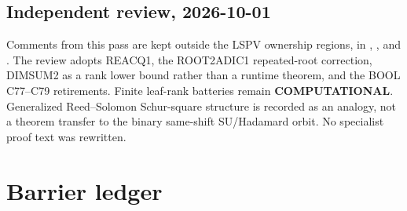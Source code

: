 \documentclass[11pt]{article}
\begin{document}
\subsection{Independent review, 2026-10-01}

Comments from this pass are kept outside the LSPV ownership regions, in
, , and .
The review adopts REACQ1, the ROOT2ADIC1 repeated-root correction, DIMSUM2 as a
rank lower bound rather than a runtime theorem, and the BOOL C77--C79 retirements.
Finite leaf-rank batteries remain \textbf{COMPUTATIONAL}. Generalized Reed--Solomon
Schur-square structure is recorded as an analogy, not a theorem transfer to the
binary same-shift SU/Hadamard orbit. No specialist proof text was rewritten.

\section{Barrier ledger}
\end{document}
